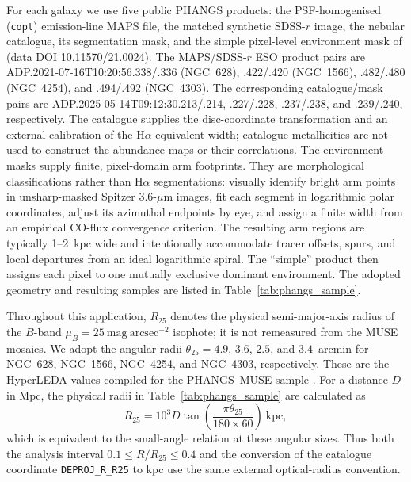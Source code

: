 \documentclass[fleqn,usenatbib]{mnras}
\begin{document}
For each galaxy we use five public PHANGS products: the PSF-homogenised (\texttt{copt}) emission-line MAPS file, the matched synthetic SDSS-$r$ image, the nebular catalogue, its segmentation mask, and the simple pixel-level environment mask of \citet{Querejeta2021} (data DOI 10.11570/21.0024).  The MAPS/SDSS-$r$ ESO product pairs are ADP.2021-07-16T10:20:56.338/.336 (NGC~628), .422/.420 (NGC~1566), .482/.480 (NGC~4254), and .494/.492 (NGC~4303).  The corresponding catalogue/mask pairs are ADP.2025-05-14T09:12:30.213/.214, .227/.228, .237/.238, and .239/.240, respectively.  The catalogue supplies the disc-coordinate transformation and an external calibration of the H$\alpha$ equivalent width; catalogue metallicities are not used to construct the abundance maps or their correlations.  The environment masks supply finite, pixel-domain arm footprints.  They are morphological classifications rather than H$\alpha$ segmentations: \citet{Querejeta2021} visually identify bright arm points in unsharp-masked Spitzer 3.6-$\mu\mathrm{m}$ images, fit each segment in logarithmic polar coordinates, adjust its azimuthal endpoints by eye, and assign a finite width from an empirical CO-flux convergence criterion.  The resulting arm regions are typically 1--2~kpc wide and intentionally accommodate tracer offsets, spurs, and local departures from an ideal logarithmic spiral.  The ``simple'' product then assigns each pixel to one mutually exclusive dominant environment.  The adopted geometry and resulting samples are listed in Table~\ref{tab:phangs_sample}.

Throughout this application, $R_{25}$ denotes the physical semi-major-axis radius of the $B$-band $\mu_B=25~\mathrm{mag~arcsec}^{-2}$ isophote; it is not remeasured from the MUSE mosaics.  We adopt the angular radii $\theta_{25}=4.9$, $3.6$, $2.5$, and $3.4$~arcmin for NGC~628, NGC~1566, NGC~4254, and NGC~4303, respectively.  These are the HyperLEDA values \citep{2014A&A...570A..13M} compiled for the PHANGS--MUSE sample \citep{2022A&A...659A.191E}.  For a distance $D$ in Mpc, the physical radii in Table~\ref{tab:phangs_sample} are calculated as
\begin{equation}
    R_{25}=10^3 D\tan\left(\frac{\pi\theta_{25}}{180\times60}\right)~\mathrm{kpc},
    \label{eq:phangs_r25_conversion}
\end{equation}
which is equivalent to the small-angle relation at these angular sizes.  Thus both the analysis interval $0.1\leq R/R_{25}\leq0.4$ and the conversion of the catalogue coordinate \texttt{DEPROJ\_R\_R25} to kpc use the same external optical-radius convention.
\end{document}
